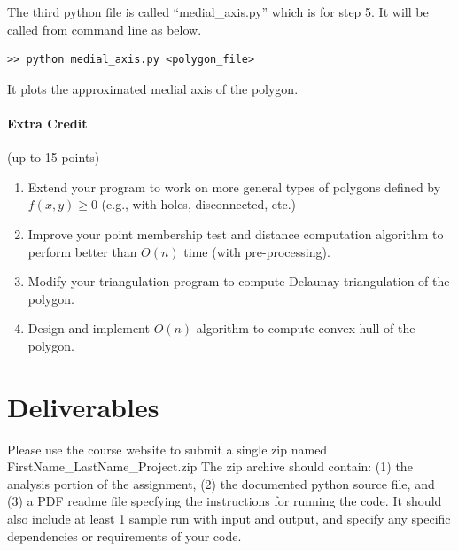 \documentclass[11pt]{article}
\begin{document}
\begin{enumerate}
The third python file is called ``medial\_axis.py'' which is for step 5. It will be called from command line as below.
\begin{lstlisting}
>> python medial_axis.py <polygon_file>
\end{lstlisting}
It plots the approximated medial axis of the polygon.


\end{enumerate}

\paragraph {Extra Credit} (up to 15 points)
\begin{enumerate}
\item
Extend your program to work on more general types of polygons defined by $f(x,y) \ge 0$ (e.g., with holes, disconnected, etc.)
\item 
Improve your point membership test and distance computation algorithm to perform better than $O(n)$ time (with pre-processing).  
\item
Modify your triangulation program to compute Delaunay triangulation of the polygon. 
\item 
Design and implement $O(n)$ algorithm to compute convex hull of the polygon. 

\end{enumerate}



\section*{Deliverables}

Please use the course website to submit a single  zip  named   FirstName\_LastName\_Project.zip
The zip archive should contain:  (1) the analysis portion of the assignment,  (2)  the documented python source file, and (3) a PDF readme file  specfying the instructions for running the code.  It should also include at least 1 sample run with input and output,  and specify any specific dependencies or requirements of your code.  
\end{document}

